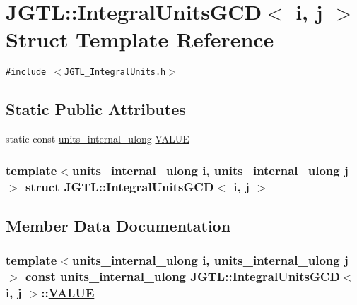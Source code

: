 \hypertarget{struct_j_g_t_l_1_1_integral_units_g_c_d}{
\section{JGTL::Integral\-Units\-GCD$<$ i, j $>$ Struct Template Reference}
\label{struct_j_g_t_l_1_1_integral_units_g_c_d}
}
{\tt \#include $<$JGTL\_\-Integral\-Units.h$>$}

\subsection*{Static Public Attributes}
\begin{CompactItemize}
\item 
static const \hyperlink{namespace_j_g_t_l_1924d6fd42e2d9661bc0b5a5063b99b3}{units\_\-internal\_\-ulong} \hyperlink{struct_j_g_t_l_1_1_integral_units_g_c_d_ac0b8330d1fad96221c65bace9f042b5}{VALUE}
\end{CompactItemize}
\subsubsection*{template$<$units\_\-internal\_\-ulong i, units\_\-internal\_\-ulong j$>$ struct JGTL::Integral\-Units\-GCD$<$ i, j $>$}



\subsection{Member Data Documentation}
\hypertarget{struct_j_g_t_l_1_1_integral_units_g_c_d_ac0b8330d1fad96221c65bace9f042b5}{
\subsubsection[VALUE]{\setlength{\rightskip}{0pt plus 5cm}template$<$units\_\-internal\_\-ulong i, units\_\-internal\_\-ulong j$>$ const \hyperlink{namespace_j_g_t_l_1924d6fd42e2d9661bc0b5a5063b99b3}{units\_\-internal\_\-ulong} \hyperlink{struct_j_g_t_l_1_1_integral_units_g_c_d}{JGTL::Integral\-Units\-GCD}$<$ i, j $>$::\hyperlink{struct_j_g_t_l_1_1_integral_units_g_c_d_ac0b8330d1fad96221c65bace9f042b5}{VALUE}}}
\label{struct_j_g_t_l_1_1_integral_units_g_c_d_ac0b8330d1fad96221c65bace9f042b5}


